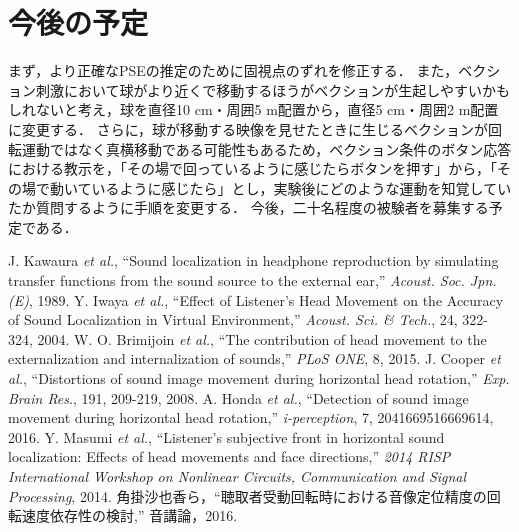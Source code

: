 \documentclass[12pt,a4j]{jsarticle}
\renewcommand{\ }{\hspace{1zw}}
\begin{document}
\section{今後の予定}
\ まず，より正確なPSEの推定のために固視点のずれを修正する．
また，ベクション刺激において球がより近くで移動するほうがベクションが生起しやすいかもしれないと考え，球を直径10 cm・周囲5 m配置から，直径5 cm・周囲2 m配置に変更する．
さらに，球が移動する映像を見せたときに生じるベクションが回転運動ではなく真横移動である可能性もあるため，ベクション条件のボタン応答における教示を，「その場で回っているように感じたらボタンを押す」から，「その場で動いているように感じたら」とし，実験後にどのような運動を知覚していたか質問するように手順を変更する．
今後，二十名程度の被験者を募集する予定である．

\begin{thebibliography}{1}
     J. Kawaura {\it et al.}, ``Sound localization in headphone reproduction by simulating transfer functions from the sound source to the external ear,'' {\it Acoust. Soc. Jpn.(E)}, 1989.
     Y. Iwaya {\it et al.}, ``Effect of Listener's Head Movement on the Accuracy of Sound Localization in Virtual Environment,'' {\it Acoust. Sci. \& Tech.}, 24, 322-324, 2004.
     W. O. Brimijoin {\it et al.}, ``The contribution of head movement to the externalization and internalization of sounds,'' {\it PLoS ONE}, 8, 2015.
     J. Cooper {\it et al.}, ``Distortions of sound image movement during horizontal head rotation,'' {\it Exp. Brain Res}., 191, 209-219, 2008.
     A. Honda {\it et al.}, ``Detection of sound image movement during horizontal head rotation,'' {\it i-perception}, 7, 2041669516669614, 2016.
     Y. Masumi {\it et al.}, ``Listener's subjective front in horizontal sound localization: Effects of head movements and face directions,'' {\it 2014 RISP International Workshop on Nonlinear Circuits, Communication and Signal Processing}, 2014.
     角掛沙也香ら，``聴取者受動回転時における音像定位精度の回転速度依存性の検討,'' 音講論，2016.
\end{thebibliography}
\end{document}
